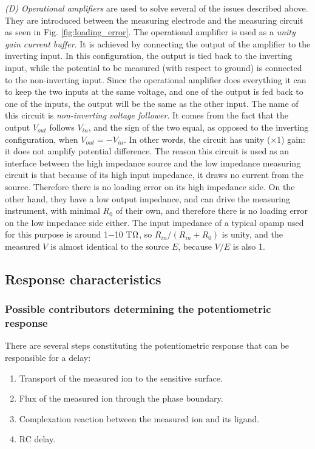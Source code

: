 \emph{(D) Operational amplifiers} are used to solve several of the issues described above.
They are introduced between the measuring electrode and the measuring circuit as seen in Fig. \ref{fig:loading_error}.
The operational amplifier is used as a \emph{unity gain current buffer}.
It is achieved by connecting the output of the amplifier to the inverting input.
In this configuration, the output is tied back to the inverting input, while the potential to be measured (with respect to ground) is connected to the non-inverting input.
Since the operational amplifier does everything it can to keep the two inputs at the same voltage, and one of the output is fed back to one of the inputs, the output will be the same as the other input.  
The name of this circuit is \emph{non-inverting voltage follower}.
It comes from the fact that the output $V_{out}$ follows $V_{in}$, and the sign of the two equal, as opposed to the inverting configuration, when $V_{out}=-V_{in}$.
In other words, the circuit has unity ($\times 1$) gain: it does not amplify potential difference.
The reason this circuit is used as an interface between the high impedance source and the low impedance measuring circuit is that because of its high input impedance, it draws no current from the source.
Therefore there is no loading error on its high impedance side.
On the other hand, they have a low output impedance, and can drive the measuring instrument, with minimal $R_0$ of their own, and therefore there is no loading error on the low impedance side either.
The input impedance of a typical opamp used for this purpose is around 1$-$10 T$\ohm$, so $R_{in}/(R_{in}+R_0)$ is unity, and the measured $V$ is almost identical to the source $E$, because $V/E$ is also 1.

		\subsection{Response characteristics}
\subsubsection{Possible contributors determining the potentiometric response}
There are several steps constituting the potentiometric response that can be responsible for a delay:

\begin{enumerate}
\item Transport of the measured ion to the sensitive surface.
\item Flux of the measured ion through the phase boundary.
\item Complexation reaction between the measured ion and its ligand.
\item RC delay.
\end{enumerate}

